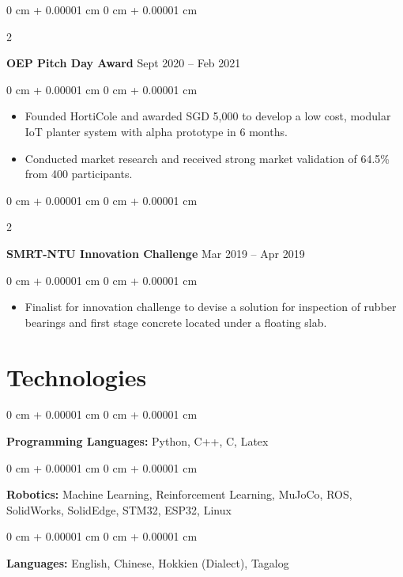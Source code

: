 \documentclass[10pt, letterpaper]{article}
\newenvironment{highlights}{
    \begin{itemize}[
        topsep=0.10 cm,
        parsep=0.10 cm,
        partopsep=0pt,
        itemsep=0pt,
        leftmargin=0 cm + 10pt
    ]
}{
    \end{itemize}
} %
\newenvironment{onecolentry}{
    \begin{adjustwidth}{
        0 cm + 0.00001 cm
    }{
        0 cm + 0.00001 cm
    }
}{
    \end{adjustwidth}
} %
\newenvironment{twocolentry}[2][]{
    \onecolentry
    \def\secondColumn{#2}
    \setcolumnwidth{\fill, 4.5 cm}
    \begin{paracol}{2}
}{
    \switchcolumn \raggedleft \secondColumn
    \end{paracol}
    \endonecolentry
} %
\begin{document}
        \begin{twocolentry}{
            Sept 2020 – Feb 2021
        }
            \textbf{OEP Pitch Day Award}\end{twocolentry}

        \vspace{0.10 cm}
        \begin{onecolentry}
            \begin{highlights}
                \item Founded HortiCole and awarded SGD 5,000 to develop a low cost, modular IoT planter system with alpha prototype in 6 months.
                \item Conducted market research and received strong market validation of 64.5\% from 400 participants.
            \end{highlights}
        \end{onecolentry}


        \vspace{0.2 cm}

        \begin{twocolentry}{
            Mar 2019 – Apr 2019
        }
            \textbf{SMRT-NTU Innovation Challenge}\end{twocolentry}

        \vspace{0.10 cm}
        \begin{onecolentry}
            \begin{highlights}
                \item Finalist for innovation challenge to devise a solution for inspection of rubber bearings and first stage concrete located under a floating slab.
            \end{highlights}
        \end{onecolentry}



    
    \section{Technologies}



        
        \begin{onecolentry}
            \textbf{Programming Languages:} Python, C++, C, Latex
        \end{onecolentry}

        \vspace{0.2 cm}

        \begin{onecolentry}
            \textbf{Robotics:} Machine Learning, Reinforcement Learning, MuJoCo, ROS, SolidWorks, SolidEdge, STM32, ESP32, Linux
        \end{onecolentry}

        \vspace{0.2 cm}

        \begin{onecolentry}
            \textbf{Languages:} English, Chinese, Hokkien (Dialect), Tagalog
        \end{onecolentry}


    
\end{document}
